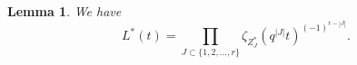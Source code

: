 \documentclass{amsart}
\numberwithin{equation}{section}
\theoremstyle{plain}
\newtheorem{lemma}[equation]{Lemma}
\theoremstyle{definition}
\renewcommand{\mathbb}{\mathbf}
\renewcommand{\setminus}{\mathbin{\rule[0.2em]{0.67em}{0.12em}}}%
\begin{document}

\begin{lemma}%
  \label{lemma:from-l-star-to-zeta}
  We have
  \begin{equation*}
    L^*(t) = \prod_{J\subset \{1,2,\ldots,r\}}
    \zeta_{Z^*_{J}}(q^{|J|}t)^{(-1)^{r-|J|}}.
  \end{equation*}
\end{lemma}
\end{document}
